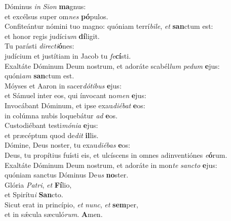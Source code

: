 \evenverse Dóminus \textit{in} \textit{Si}\textit{on} \textbf{ma}gnus:~\*\\
\evenverse et excélsus super om\textit{nes} \textbf{pó}pulos.\\
\oddverse Confiteántur nómini tuo magno: quóniam terrí\textit{bi}\textit{le}, \textit{et} \textbf{san}ctum est:~\*\\
\oddverse et honor regis judíci\textit{um} \textbf{dí}ligit.\\
\evenverse Tu parásti \textit{di}\textit{re}\textit{cti}\textbf{ó}nes:~\*\\
\evenverse judícium et justítiam in Jacob tu \textit{fe}\textbf{cí}sti.\\
\oddverse Exaltáte Dóminum Deum nostrum, et adoráte scabél\textit{lum} \textit{pe}\textit{dum} \textbf{e}jus:~\*\\
\oddverse quóni\textit{am} \textbf{san}ctum est.\\
\evenverse Móyses et Aaron in sacer\textit{dó}\textit{ti}\textit{bus} \textbf{e}jus:~\*\\
\evenverse et Sámuel inter eos, qui ínvocant no\textit{men} \textbf{e}jus:\\
\oddverse Invocábant Dóminum, et ipse exau\textit{di}\textit{é}\textit{bat} \textbf{e}os:~\*\\
\oddverse in colúmna nubis loquebátur \textit{ad} \textbf{e}os.\\
\evenverse Custodiébant testi\textit{mó}\textit{ni}\textit{a} \textbf{e}jus:~\*\\
\evenverse et præcéptum quod de\textit{dit} \textbf{il}lis.\\
\oddverse Dómine, Deus noster, tu exau\textit{di}\textit{é}\textit{bas} \textbf{e}os:~\*\\
\oddverse Deus, tu propítius fuísti eis, et ulcíscens in omnes adinventiónes \textit{e}\textbf{ó}rum.\\
\evenverse Exaltáte Dóminum Deum nostrum, et adoráte in mon\textit{te} \textit{san}\textit{cto} \textbf{e}jus:~\*\\
\evenverse quóniam sanctus Dóminus De\textit{us} \textbf{no}ster.\\
\oddverse Glória \textit{Pa}\textit{tri}, \textit{et} \textbf{Fí}lio,~\*\\
\oddverse et Spirítu\textit{i} \textbf{San}cto.\\
\evenverse Sicut erat in princípio, \textit{et} \textit{nunc}, \textit{et} \textbf{sem}per,~\*\\
\evenverse et in sǽcula sæculó\textit{rum}. \textbf{A}men.\\
